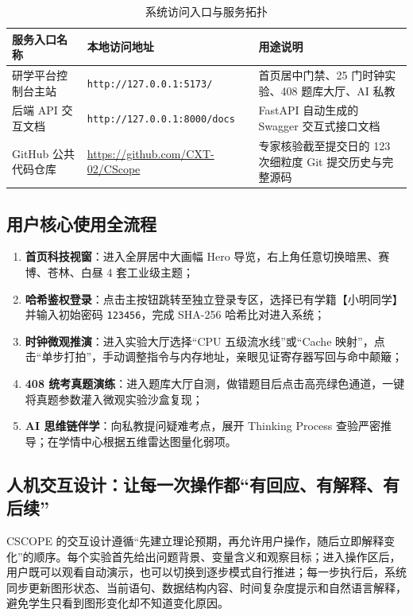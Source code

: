 \documentclass[UTF8,a4paper,11pt]{ctexart}
\begin{document}
\begin{table}[htbp]
\centering
\small
\caption{系统访问入口与服务拓扑}
\begin{tabularx}{\textwidth}{p{3.8cm}p{4cm}X}
\toprule
\textbf{服务入口名称} & \textbf{本地访问地址} & \textbf{用途说明} \\
\midrule
研学平台控制台主站 & \texttt{http://127.0.0.1:5173/} & 首页居中门禁、25 门时钟实验、408 题库大厅、AI 私教 \\
后端 API 交互文档 & \texttt{http://127.0.0.1:8000/docs} & FastAPI 自动生成的 Swagger 交互式接口文档 \\
GitHub 公共代码仓库 & \url{https://github.com/CXT-02/CScope} & 专家核验截至提交日的 123 次细粒度 Git 提交历史与完整源码 \\
\bottomrule
\end{tabularx}
\end{table}

\subsection{用户核心使用全流程}
\begin{enumerate}
    \item \textbf{首页科技视窗}：进入全屏居中大画幅 Hero 导览，右上角任意切换暗黑、赛博、苍林、白昼 4 套工业级主题；
    \item \textbf{哈希鉴权登录}：点击主按钮跳转至独立登录专区，选择已有学籍【小明同学】并输入初始密码 \texttt{123456}，完成 SHA-256 哈希比对进入系统；
    \item \textbf{时钟微观推演}：进入实验大厅选择“CPU 五级流水线”或“Cache 映射”，点击“单步打拍”，手动调整指令与内存地址，亲眼见证寄存器写回与命中颠簸；
    \item \textbf{408 统考真题演练}：进入题库大厅自测，做错题目后点击高亮绿色通道，一键将真题参数灌入微观实验沙盒复现；
    \item \textbf{AI 思维链伴学}：向私教提问疑难考点，展开 Thinking Process 查验严密推导；在学情中心根据五维雷达图量化弱项。
\end{enumerate}

\subsection{人机交互设计：让每一次操作都“有回应、有解释、有后续”}
CSCOPE 的交互设计遵循“先建立理论预期，再允许用户操作，随后立即解释变化”的顺序。每个实验首先给出问题背景、变量含义和观察目标；进入操作区后，用户既可以观看自动演示，也可以切换到逐步模式自行推进；每一步执行后，系统同步更新图形状态、当前语句、数据结构内容、时间复杂度提示和自然语言解释，避免学生只看到图形变化却不知道变化原因。
\end{document}
